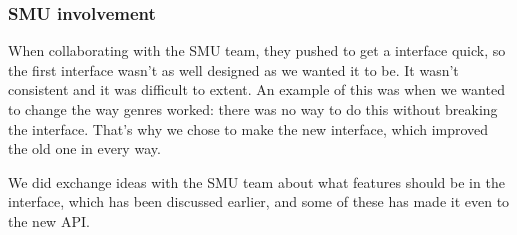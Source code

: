 \subsubsection{SMU involvement}
\label{Design_Service_Interface_SMU}
When collaborating with the SMU team, they pushed to get a interface quick, so the first interface wasn't as well designed as we wanted it to be. It wasn't consistent and it was difficult to extent. An example of this was when we wanted to change the way genres worked: there was no way to do this without breaking the interface. That's why we chose to make the new interface, which improved the old one in every way.

We did exchange ideas with the SMU team about what features should be in the interface, which has been discussed earlier, and some of these has made it even to the new API.

